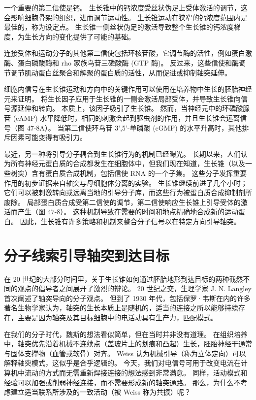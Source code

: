 一个重要的第二信使是钙。 生长锥中的钙浓度受丝状伪足上受体激活的调节，这会影响细胞骨架的组织，进而调节运动性。 生长锥运动在狭窄的钙浓度范围内是最佳的，称为设定点。 生长锥一侧丝状伪足的激活导致整个生长锥的钙浓度梯度，为生长方向的变化提供了可能的基础。

连接受体和运动分子的其他第二信使包括环核苷酸，它调节酶的活性，例如蛋白激酶、蛋白磷酸酶和 rho 家族鸟苷三磷酸酶 (GTP 酶)。 反过来，这些信使和酶调节调节肌动蛋白丝聚合和解聚的蛋白质的活性，从而促进或抑制轴突延伸。

细胞内信号在生长锥运动和方向中的关键作用可以使用在培养物中生长的胚胎神经元来证明。 将生长因子应用于生长锥的一侧会激活局部受体，并导致生长锥向信号源延伸和转向。 本质上，该因子吸引了生长锥。 然而，当神经元中的环磷酸腺苷 (cAMP) 水平降低时，相同的刺激会起到驱虫剂的作用，并且生长锥会远离信号（图 47-8A）。 当第二信使环鸟苷 3',5'-单磷酸 (cGMP) 的水平升高时，其他排斥因素可能变得有吸引力。

最近，另一种将引导分子耦合到生长锥行为的机制已经曝光。 长期以来，人们认为所有神经元蛋白质的合成都发生在细胞体中，但我们现在知道，生长锥（以及一些树突）含有蛋白质合成机制，包括信使 RNA 的一个子集。 这些分子发挥重要作用的初步证据来自轴突与母细胞体分离的实验。 生长锥继续前进了几个小时； 它们可以被刺激转向或远离当地的引导分子库，而这些行为被蛋白质合成抑制剂所废除。 局部蛋白质合成受第二信使的调节，第二信使响应生长锥上引导受体的激活而产生（图 47-8）。 这种机制导致在需要的时间和地点精确地合成新的运动蛋白。 因此，生长锥有许多策略和机制来整合分子信号以在特定方向引导轴突。


\section{分子线索引导轴突到达目标}
在 20 世纪的大部分时间里，关于生长锥如何通过胚胎地形到达目标的两种截然不同的观点的倡导者之间展开了激烈的辩论。 20 世纪之交，生理学家 J. N. Langley 首次阐述了轴突导向的分子观点。 但到了 1930 年代，包括保罗·韦斯在内的许多著名生物学家认为，轴突的生长本质上是随机的，适当的连接之所以能够持续存在，主要是因为轴突及其目标细胞中的电活动具有生产力，匹配模式。

在我们的分子时代，魏斯的想法看似简单，但在当时并非没有道理。 在组织培养中，轴突优先沿着机械不连续点（盖玻片上的划痕和凸起）生长，胚胎神经干通常与固体支撑物（血管或软骨）对齐。 Weiss 认为机械引导（称为立体定向）可以解释轴突模式，这似乎是合乎逻辑的。 今天，我们对电信号可用于改变电流在计算机中流动的方式而无需重新焊接连接的想法感到非常满意。 同样，活动模式和经验可以加强或削弱神经连接，而不需要形成新的轴突通路。 那么，为什么不考虑建立适当联系所涉及的一致活动（被 Weiss 称为共振）呢？

